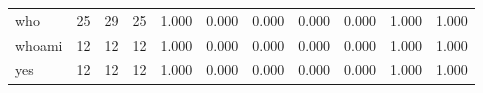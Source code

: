 \begin{longtable}{lp{1.8cm}p{1.8cm}p{1.8cm}p{1.8cm}p{1.8cm}p{1.8cm}p{1.8cm}p{1.8cm}p{1.8cm}p{1.8cm}}
who       &                           25 &                 29 &                                25 &                                      1.000 &                                  0.000 &                                        0.000 &                             0.000 &                                   0.000 &                              1.000 &                                              1.000 \\
whoami    &                           12 &                 12 &                                12 &                                      1.000 &                                  0.000 &                                        0.000 &                             0.000 &                                   0.000 &                              1.000 &                                              1.000 \\
yes       &                           12 &                 12 &                                12 &                                      1.000 &                                  0.000 &                                        0.000 &                             0.000 &                                   0.000 &                              1.000 &                                              1.000 \\
\end{longtable}
